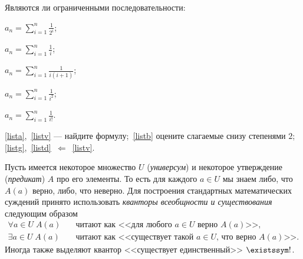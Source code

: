 \documentclass[a4paper, 12pt, num=2426, date=01.09.2020]{listok}
\begin{document}
\begin{problem}[$\mathghost$]
    Являются ли ограниченными последовательности:
    \begin{probparts}
        \item\label{lista} $a_n = \sum\limits_{i = 1}^n \frac1{2^i}$;
        \item\label{listb} $a_n = \sum\limits_{i = 1}^n \frac1i$;
        \item\label{listv} $a_n = \sum\limits_{i = 1}^n \frac1{i(i + 1)}$;
        \item\label{listg} $a_n = \sum\limits_{i = 1}^n \frac1{i^2}$;
        \item\label{listd} $a_n = \sum\limits_{i = 1}^n \frac1{i!}$.
    \end{probparts}
\end{problem}
\begin{note}
    \ref{lista},~\ref{listv} --- найдите формулу;~\ref{listb} оцените слагаемые снизу степенями $2$;
    \ref{listg},~\ref{listd}~$\Leftarrow$~\ref{listv}.
\end{note}

\begin{definition}
    Пусть имеется некоторое множество $U$ (\textit{универсум})
    и некоторое утверждение (\textit{предикат}) $A$ про его элементы.
    То есть для каждого $a \in U$ мы знаем либо, что $A(a)$ верно, либо, что неверно.
    Для построения стандартных математических суждений принято использовать \textit{кванторы всеобщности и существования} следующим образом
    \begin{align*}
        \forall{a \in U} \; A(a) &\quad\text{читают как <<для любого $a \in U$ верно $A(a)$>>},\\
        \exists{a \in U} \; A(a) &\quad\text{читают как <<существует такой $a \in U$, что верно $A(a)$>>}.
    \end{align*}
    Иногда также выделяют квантор <<существует единственный>> $\existssym!$.
\end{definition}
\end{document}
